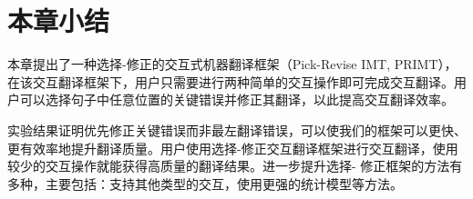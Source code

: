 \documentclass[master, winfont]{njuthesis}
\begin{document}
%
%

\section{本章小结}
本章提出了一种选择-修正的交互式机器翻译框架（Pick-Revise IMT, PRIMT），在该交互翻译框架下，用户只需要进行两种简单的交互操作即可完成交互翻译。用户可以选择句子中任意位置的关键错误并修正其翻译，以此提高交互翻译效率。

实验结果证明优先修正关键错误而非最左翻译错误，可以使我们的框架可以更快、更有效率地提升翻译质量。用户使用选择-修正交互翻译框架进行交互翻译，使用较少的交互操作就能获得高质量的翻译结果。进一步提升选择- 修正框架的方法有多种，主要包括：支持其他类型的交互，使用更强的统计模型等方法。
\end{document}
